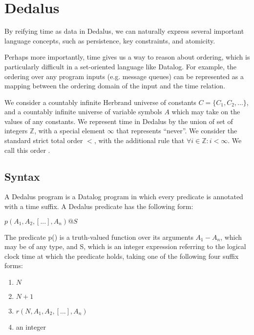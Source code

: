 \section{Dedalus}

By reifying time as data in Dedalus, we can naturally express several important
language concepts, such as persistence, key constraints, and atomicity.

Perhaps more importantly, 
time gives us a way to reason about ordering, which is particularly difficult
in a set-oriented language like Datalog.  For example, the ordering over any
program inputs (e.g. message queues) can be represented as a mapping between
the ordering domain of the input and the time relation.

We consider a countably infinite Herbrand universe of constants $C = \{ C_{1},
C_{2}, ... \}$, and a countably infinite universe of variable symbols $A$ which
may take on the values of any constants.   
%
We represent time in Dedalus by the union of set of integers $\mathbb{Z}$, with
a special element $\infty$ that represents ``never''.  We consider the standard
strict total order $<$, with the additional rule that $\forall i \in
\mathbb{Z}: i < \infty$.  We call this order .

\subsection{Syntax}

A Dedalus program is a Datalog program in which every predicate is annotated with a time suffix.  A Dedalus predicate has the following form:

$p(A_{1}, A_{2}, [...], A_{n})@S$

The predicate p() is a truth-valued function over its arguments $A_{1} - A_{n}$, which may be of any type, and S, which is an integer expression 
referring to the logical clock time at which the predicate holds, taking one of the following four suffix forms:

\begin{enumerate}
\item $N$
\item $N + 1$
\item $r(N, A_{1}, A_{2}, [...], A_{n})$
\item an integer
\end{enumerate}

